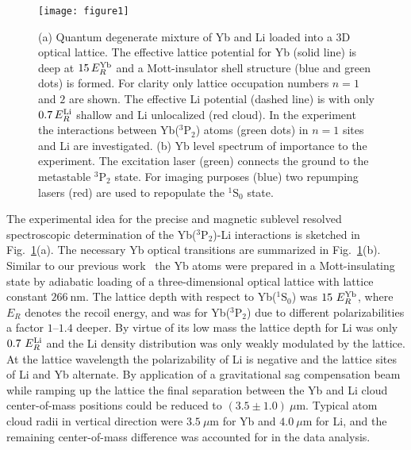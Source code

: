 \documentclass[twocolumn,superscriptaddress,showpacs,floatfix,amsmath,amssymb]{revtex4-1}
\newcommand{\singlet}{{}^1\mathrm{S}_0}
\newcommand{\triplet}{{}^3\mathrm{P}_2}
\newcommand{\micron}{\mu\mathrm{m}}
\newcommand{\nm}{\mathrm{nm}}
\begin{document}
\begin{figure}[tb]
	\centering
	\texttt{[image: figure1]}
	\caption{
		(a) Quantum degenerate mixture of Yb and Li loaded into a 3D optical
		lattice. The effective lattice potential for Yb (solid line) is deep at
		$15\,E_R^{\rm Yb}$ and a Mott-insulator shell structure (blue and green
		dots) is formed. For clarity only lattice occupation numbers $n = 1$ and
		$2$ are shown. The effective Li potential (dashed line) is with only
		$0.7\,E_R^{\rm Li}$ shallow and Li unlocalized (red cloud). In the
		experiment the interactions between Yb($\triplet$) atoms (green dots) in
		$n = 1$ sites and Li are investigated.
		(b) Yb level spectrum of importance to the experiment. The excitation
		laser (green) connects the ground to the metastable $\triplet$ state. For
		imaging purposes (blue) two repumping lasers (red) are used to repopulate
		the $\singlet$ state. 
	}
	\label{fig:setup}
\end{figure}

The experimental idea for the precise and magnetic sublevel resolved
spectroscopic determination of the Yb($\triplet$)-Li interactions is sketched
in Fig.~\ref{fig:setup}(a). The necessary Yb optical transitions are
summarized in Fig.~\ref{fig:setup}(b). Similar to our previous
work~\cite{schafer_spin_2017} the Yb atoms were prepared in a Mott-insulating
state by adiabatic loading of a three-dimensional optical lattice with lattice
constant $266~\nm$. The lattice depth with respect to Yb($\singlet$) was
$15~E_R^{\rm Yb}$, where $E_R$ denotes the recoil energy, and was for
Yb($\triplet$) due to different polarizabilities a factor $1$--$1.4$ deeper.
By virtue of its low mass the lattice depth for Li was only $0.7~E_R^{\rm Li}$
and the Li density distribution was only weakly modulated by the
lattice. At the lattice wavelength the polarizability of Li is negative and
the lattice sites of Li and Yb alternate. By application of a gravitational
sag compensation beam~\cite{konishi_collisional_2016} while ramping up the
lattice the final separation between the Yb and Li cloud center-of-mass
positions could be reduced to $(3.5 \pm 1.0 )~\micron$. Typical atom
cloud radii in vertical direction were $3.5~\micron$ for Yb and $4.0~\micron$
for Li, and the remaining center-of-mass difference was accounted for in the
data analysis.
\end{document}
